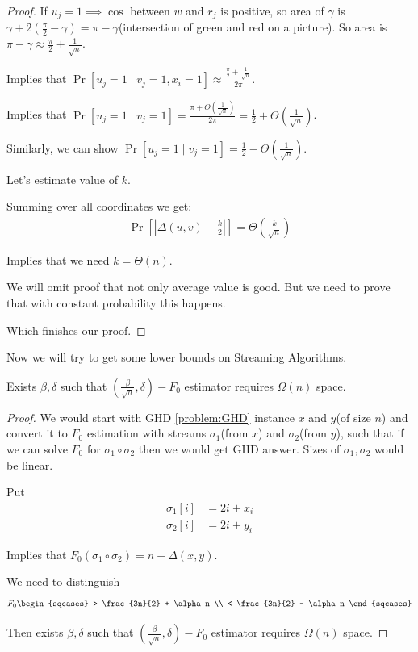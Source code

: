 \begin{proof}
	
	If $u_j = 1 \implies \cos$ between $w$ and $r_j$ is positive, so area of $\gamma$ is $\gamma + 2(\frac \pi 2 - \gamma) = \pi - \gamma$(intersection of green and red on a picture). 
	So area is $\pi - \gamma  \approx \frac \pi 2 + \frac{1}{\sqrt n}$.

	Implies that $\Pr[u_j = 1 \mid v_j = 1, x_i = 1] \approx \frac{\frac \pi 2 + \frac{1}{\sqrt n}}{2 \pi}$.
	
	Implies that $\Pr[u_j = 1 \mid v_j = 1] = \frac{\pi + \Theta(\frac{1}{\sqrt n})}{2 \pi} = \frac 1 2 + \Theta(\frac 1 {\sqrt n})$.
	
	Similarly, we can show $\Pr[u_j = 1 \mid v_j = 1] = \frac 1 2 - \Theta(\frac{1}{\sqrt n})$.
	
	Let's estimate value of $k$.
	
	Summing over all coordinates we get:
	\begin{align*}
		\Pr\left[\left|\Delta(u, v) - \frac k 2\right|\right] = \Theta\left(\frac k {\sqrt n}\right)
	\end{align*}
	
	Implies that we need $k = \Theta(n)$.
	
	We will omit proof that not only average value is good.
	But we need to prove that with constant probability this happens.
	
	Which finishes our proof.

\end{proof}

Now we will try to get some lower bounds on Streaming Algorithms.

\begin{thm}
	Exists $\beta, \delta$ such that $(\frac{\beta}{\sqrt n}, \delta)-F_0$ estimator requires $\Omega(n)$ space.
\end{thm}
\begin{proof}
	We would start with GHD \ref{problem:GHD} instance $x$ and $y$(of size $n$) and convert it to $F_0$ estimation with streams $\sigma_1$(from $x$) and $\sigma_2$(from $y$), such that if we can solve $F_0$ for $\sigma_1 \circ \sigma_2$ then we would get GHD answer.
	Sizes of $\sigma_1, \sigma_2$ would be linear.
	
	Put
	\begin{align*}
		\sigma_1[i] &= 2i + x_i \\
		\sigma_2[i] &= 2i + y_i
	\end{align*}
	
	Implies that $F_0(\sigma_1 \circ \sigma_2) = n + \Delta(x, y)$.
	
	We need to distinguish 
	\begin{align*}
		F_0 \begin{sqcases}
			> \frac{3n}{2} + \alpha n \\
			< \frac{3n}{2} - \alpha n
		\end{sqcases}
	\end{align*}
	
	Then exists $\beta, \delta$ such that $(\frac{\beta}{\sqrt n}, \delta)-F_0$ estimator requires $\Omega(n)$ space.
	
\end{proof}

